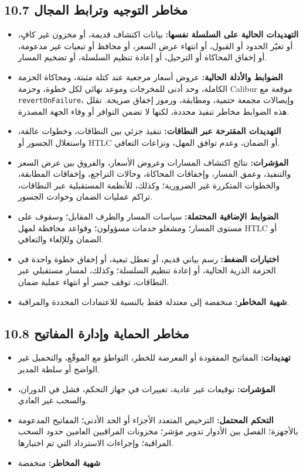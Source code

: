 \documentclass[11pt]{article}
\begin{document}
\subsection*{10.7 مخاطر التوجيه وترابط المجال}

\begin{itemize}[leftmargin=*]
\item \textbf{التهديدات الحالية على السلسلة نفسها:} بيانات اكتشاف قديمة، أو مخزون غير كافٍ، أو تغيّر الحدود أو القبول، أو انتهاء عرض السعر، أو محافظ أو تبعيات غير مدعومة، أو إخفاق المحاكاة أو الترحيل، أو إعادة تنظيم السلسلة، أو تضخيم المسار.
\item \textbf{الضوابط والأدلة الحالية:} عروض أسعار مرجعية عند كتلة مثبتة، ومحاكاة الحزمة الكاملة، وحد أدنى للمخرجات وموعد نهائي لكل خطوة، وحزمة Calibur موقعة مع \texttt{revertOnFailure}، وإيصالات مجمعة حتمية، ومطابقة، ورموز إخفاق صريحة. تقلل هذه الضوابط مخاطر تنفيذ محددة، لكنها لا تضمن التوافر أو وفاء الجهة المصدرة.
\item \textbf{التهديدات المقترحة عبر النطاقات:} تنفيذ جزئي بين النطاقات، وخطوات عالقة، واستغلال الجسور أو HTLC أو الضمان، وعدم توافق المهل، ونزاعات التعافي.
\item \textbf{المؤشرات:} نتائج اكتشاف المسارات وعروض الأسعار، والفروق بين عرض السعر والتنفيذ، وعمق المسار، وإخفاقات المحاكاة، وحالات التراجع، وإخفاقات المطابقة، والخطوات المتكررة غير الضرورية؛ وكذلك، للأنظمة المستقبلية عبر النطاقات، تراكم عمليات الضمان وحوادث الجسور.
\item \textbf{الضوابط الإضافية المحتملة:} سياسات المسار والطرف المقابل؛ وسقوف على مستوى المسار؛ ومشغلو خدمات مسؤولون؛ وقواعد محافظة لمهل HTLC أو الضمان وللإلغاء والتعافي.
\item \textbf{اختبارات الضغط:} رسم بياني قديم، أو تعطل تبعية، أو إخفاق خطوة واحدة في الحزمة الذرية الحالية، أو إعادة تنظيم السلسلة؛ وكذلك، لمسار مستقبلي عبر النطاقات، توقف جسر أو انتهاء عملية ضمان.
\item \textbf{شهية المخاطر:} منخفضة إلى معتدلة فقط بالنسبة للاعتمادات المحددة والمراقبة.
\end{itemize}
\subsection*{10.8 مخاطر الحماية وإدارة المفاتيح}

\begin{itemize}[leftmargin=*]
\item \textbf{تهديدات:} المفاتيح المفقودة أو المعرضة للخطر، التواطؤ مع الموقّع، والتحميل غير الواضح أو سلطة المدير.
\item \textbf{المؤشرات:} توقيعات غير عادية، تغييرات في جهاز التحكم، فشل في الدوران، والسحب غير العادي.
\item \textbf{التحكم المحتمل:} الترخيص المتعدد الأجزاء أو الحد الأدنى؛ المفاتيح المدعومة بالأجهزة؛ الفصل بين الأدوار تدوير مؤشر؛ مخزونات المراقبين العامين حدود السحب المراقبة؛ وإجراءات الاسترداد التي تم اختبارها.
\item \textbf{شهية المخاطر:} منخفضة
\end{itemize}
\end{document}
